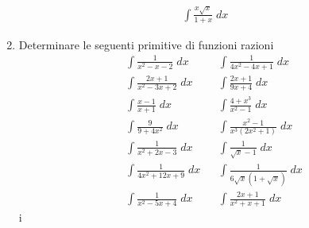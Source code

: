 \begin{enumerate}
\begin{align*}
		       & \int  \frac{x \sqrt{x}}{1 +x}\; dx          &  &
	      \end{align*}
	\item Determinare le seguenti primitive di funzioni razioni
	      \begin{align*}
		       & \int \frac{1}{x^2  - x - 2}\; dx      &  & \int \frac{1}{4x^2  - 4x + 1}\; dx                       \\
		       & \int \frac{2x + 1}{x^2 - 3x + 2}\; dx &  & \int \frac{2x + 1}{9x + 4}\; dx                          \\
		       & \int \frac{x-1}{x+1}\; dx             &  & \int \frac{4 + x^3 }{x^2  - 1} \; dx                     \\
		       & \int \frac{9}{9 + 4x^2 }\; dx         &  & \int \frac{x^2  - 1}{x^3 \left(2x^2  + 1\right)}\; dx    \\
		       & \int \frac{1}{x^2 + 2x - 3}\; dx      &  & \int \frac{1}{\sqrt{x} -1}\; dx                          \\
		       & \int \frac{1}{4x^2 + 12x + 9}\; dx    &  & \int \frac{1}{6 \sqrt{x} \left(1 + \sqrt{x}\right)}\; dx \\
		       & \int \frac{1}{x^2  - 5x + 4}\; dx     &  & \int \frac{2x +  1}{x^2  + x + 1} \; dx
	      \end{align*}
	      i
\end{enumerate}
